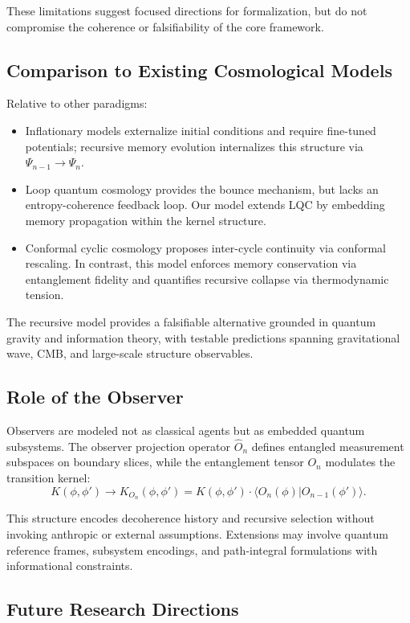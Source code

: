 These limitations suggest focused directions for formalization, but do not compromise the coherence or falsifiability of the core framework.

\subsection{Comparison to Existing Cosmological Models}

Relative to other paradigms:

\begin{itemize}
  \item Inflationary models externalize initial conditions and require fine-tuned potentials; recursive memory evolution internalizes this structure via \( \Psi_{n-1} \to \Psi_n \).
  \item Loop quantum cosmology provides the bounce mechanism, but lacks an entropy-coherence feedback loop. Our model extends LQC by embedding memory propagation within the kernel structure.
  \item Conformal cyclic cosmology proposes inter-cycle continuity via conformal rescaling. In contrast, this model enforces memory conservation via entanglement fidelity and quantifies recursive collapse via thermodynamic tension.
\end{itemize}

The recursive model provides a falsifiable alternative grounded in quantum gravity and information theory, with testable predictions spanning gravitational wave, CMB, and large-scale structure observables.

\subsection{Role of the Observer}

Observers are modeled not as classical agents but as embedded quantum subsystems. The observer projection operator \( \hat{O}_n \) defines entangled measurement subspaces on boundary slices, while the entanglement tensor \( O_n \) modulates the transition kernel:
\[
K(\phi, \phi') \to K_{O_n}(\phi, \phi') = K(\phi, \phi') \cdot \langle O_n(\phi) | O_{n-1}(\phi') \rangle.
\]

This structure encodes decoherence history and recursive selection without invoking anthropic or external assumptions. Extensions may involve quantum reference frames, subsystem encodings, and path-integral formulations with informational constraints.

\subsection{Future Research Directions}

